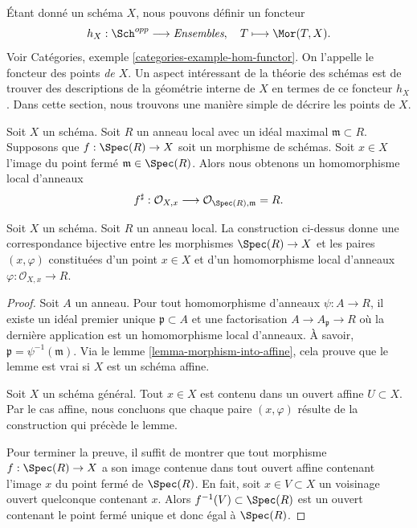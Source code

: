 \noindent
Étant donné un schéma $X$, nous pouvons définir un foncteur
$$
h_X : \Sch^{opp}
\longrightarrow
\textit{Ensembles}, \quad
T \longmapsto \Mor(T, X).
$$
Voir Catégories, exemple \ref{categories-example-hom-functor}. On l'appelle
le foncteur des points {\it de $X$}. Un aspect intéressant
de la théorie des schémas est de trouver des descriptions de
la géométrie interne de $X$ en termes de ce foncteur $h_X$. Dans cette
section, nous trouvons une manière simple de décrire les
points de $X$.

\medskip\noindent
Soit $X$ un schéma. Soit $R$ un anneau local avec un idéal maximal
$\mathfrak m \subset R$. Supposons que $f : \Spec(R) \to
X$ soit un morphisme de schémas. Soit $x \in X$ l'image du point fermé
$\mathfrak m \in \Spec(R)$. Alors nous obtenons un homomorphisme
local d'anneaux
$$
f^\sharp :
\mathcal{O}_{X, x}
\longrightarrow
\mathcal{O}_{\Spec(R), \mathfrak m} = R.
$$

\begin{lemma}
\label{lemma-morphism-from-spec-local-ring}
Soit $X$ un schéma. Soit $R$ un anneau local. La
construction ci-dessus donne une correspondance bijective
entre les morphismes $\Spec(R) \to X$ et les
paires $(x, \varphi)$ constituées d'un point $x \in X$
et d'un homomorphisme local d'anneaux $\varphi : \mathcal{O}_{X, x} \to R$.
\end{lemma}

\begin{proof}
Soit $A$ un anneau. Pour tout homomorphisme d'anneaux $\psi : A \to
R$, il existe un idéal premier unique $\mathfrak p \subset A$
et une factorisation $A \to A_{\mathfrak p} \to R$ où la dernière
application est un homomorphisme local d'anneaux. À savoir,
$\mathfrak p = \psi^{-1}(\mathfrak m)$. Via
le lemme \ref{lemma-morphism-into-affine},
cela prouve que le lemme est vrai si $X$ est un schéma affine.

\medskip\noindent
Soit $X$ un schéma général. Tout $x \in X$ est contenu dans
un ouvert affine $U \subset X$. Par le cas affine, nous concluons que
chaque paire $(x, \varphi)$ résulte de la construction qui
précède le lemme.

\medskip\noindent
Pour terminer la preuve, il suffit de montrer que tout morphisme
$f : \Spec(R) \to X$ a son image contenue dans tout
ouvert affine contenant l'image $x$ du point
fermé de $\Spec(R)$. En fait, soit $x \in V \subset X$
un voisinage ouvert quelconque contenant $x$.
Alors $f^{-1}(V) \subset \Spec(R)$ est un ouvert
contenant le point fermé unique et donc égal à $\Spec(R)$.
\end{proof}

